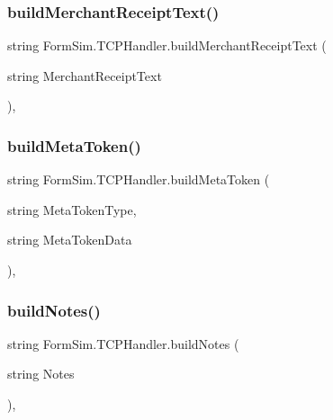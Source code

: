 \subsubsection{\texorpdfstring{build\+Merchant\+Receipt\+Text()}{buildMerchantReceiptText()}}
{\footnotesize\ttfamily string Form\+Sim.\+T\+C\+P\+Handler.\+build\+Merchant\+Receipt\+Text (\begin{DoxyParamCaption}\item[{string}]{Merchant\+Receipt\+Text }\end{DoxyParamCaption})\hspace{0.3cm}{\ttfamily [inline]}, {\ttfamily [private]}}

\mbox{\label{class_form_sim_1_1_t_c_p_handler_a8da4a9dcb24a7ccefd0dde4522ed38e1}} 
\subsubsection{\texorpdfstring{build\+Meta\+Token()}{buildMetaToken()}}
{\footnotesize\ttfamily string Form\+Sim.\+T\+C\+P\+Handler.\+build\+Meta\+Token (\begin{DoxyParamCaption}\item[{string}]{Meta\+Token\+Type,  }\item[{string}]{Meta\+Token\+Data }\end{DoxyParamCaption})\hspace{0.3cm}{\ttfamily [inline]}, {\ttfamily [private]}}

\mbox{\label{class_form_sim_1_1_t_c_p_handler_acdb4cc9ece3eb8587fd41943cfbc7e71}} 
\subsubsection{\texorpdfstring{build\+Notes()}{buildNotes()}}
{\footnotesize\ttfamily string Form\+Sim.\+T\+C\+P\+Handler.\+build\+Notes (\begin{DoxyParamCaption}\item[{string}]{Notes }\end{DoxyParamCaption})\hspace{0.3cm}{\ttfamily [inline]}, {\ttfamily [private]}}

